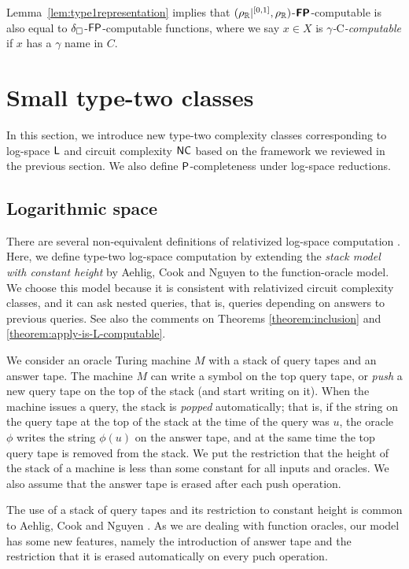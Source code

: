 \documentclass[envcountsame,orivec,oribibl]{llncs}
\begin{document}
Lemma~\ref{lem:type1representation} implies that
$(\rho _\mathbb R|^{[0,1]},\rho _\mathbb R)$-$\text{\bfseries \sffamily \upshape FP}$-computable is also equal to 
$\delta _\square$-$\mathsf{FP}$-computable functions,
where we say $x \in X$ is \emph{$\gamma$-$\mathrm C$-computable} if
$x$ has a $\gamma$ name in $C$.


\section{Small type-two classes}
\label{section:small-classes}

In this section, we introduce new type-two complexity classes
corresponding to log-space $\mathsf{L}$ and circuit complexity $\mathsf{NC}$
based on the framework we reviewed in the previous section.
We also define $\mathsf{P}$-completeness under log-space reductions.

\subsection{Logarithmic space}
There are several non-equivalent definitions of 
relativized log-space computation
\cite{aehlig2007relativizing,buss1988relativized,ladner1976relativization,wilson1988measure}.
Here, we define type-two log-space computation 
by extending the {\em stack model with constant height} 
by Aehlig, Cook and Nguyen \cite{aehlig2007relativizing} to the 
function-oracle model.
We choose this model because it is consistent with relativized circuit complexity classes, 
and it can ask nested queries, that is, queries depending on answers to previous queries.
See also the comments on Theorems \ref{theorem:inclusion} and \ref{theorem:apply-is-L-computable}.

We consider an oracle Turing machine $M$ 
with a stack of query tapes and an answer tape.
The machine $M$ can write a symbol on the top query tape, or 
\emph{push} a new query tape on the top of the stack (and start writing on it).
When the machine issues a query, the stack is \emph{popped} automatically; 
that is, 
if the string on the query tape at the top of the stack at the time of the query was $u$, 
the oracle $\phi$ writes the string $\phi (u)$ on the answer tape, 
and at the same time the top query tape is removed from the stack. 
We put the restriction that the height of the stack of a machine is less than 
some constant for all inputs and oracles.
We also assume that 
the answer tape is erased after each push operation.

The use of a stack of query tapes and its restriction to constant height 
is common to Aehlig, Cook and Nguyen \cite{aehlig2007relativizing}. 
As we are dealing with function oracles, 
our model has some new features, namely 
the introduction of answer tape and 
the restriction that it is erased automatically on every puch operation. 
\end{document}
